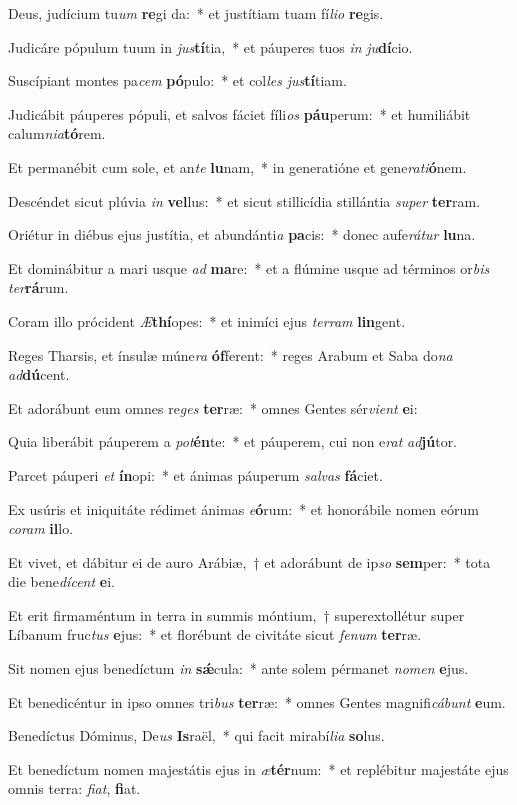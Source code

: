 \item Deus, judícium tu\textit{um} \textbf{re}gi da:~* et justítiam tuam fí\textit{li}\textit{o} \textbf{re}gis.
\item Judicáre pópulum tuum in \textit{jus}\textbf{tí}tia,~* et páuperes tuos \textit{in} \textit{ju}\textbf{dí}cio.
\item Suscípiant montes pa\textit{cem} \textbf{pó}pulo:~* et col\textit{les} \textit{jus}\textbf{tí}tiam.
\item Judicábit páuperes pópuli, et salvos fáciet fíli\textit{os} \textbf{páu}perum:~* et humiliábit calum\textit{ni}\textit{a}\textbf{tó}rem.
\item Et permanébit cum sole, et an\textit{te} \textbf{lu}nam,~* in generatióne et gene\textit{ra}\textit{ti}\textbf{ó}nem.
\item Descéndet sicut plúvia \textit{in} \textbf{vel}lus:~* et sicut stillicídia stillántia \textit{su}\textit{per} \textbf{ter}ram.
\item Oriétur in diébus ejus justítia, et abundánti\textit{a} \textbf{pa}cis:~* donec aufe\textit{rá}\textit{tur} \textbf{lu}na.
\item Et dominábitur a mari usque \textit{ad} \textbf{ma}re:~* et a flúmine usque ad términos or\textit{bis} \textit{ter}\textbf{rá}rum.
\item Coram illo prócident \textit{Æ}\textbf{thí}opes:~* et inimíci ejus \textit{ter}\textit{ram} \textbf{lin}gent.
\item Reges Tharsis, et ínsulæ múne\textit{ra} \textbf{óf}ferent:~* reges Arabum et Saba do\textit{na} \textit{ad}\textbf{dú}cent.
\item Et adorábunt eum omnes re\textit{ges} \textbf{ter}ræ:~* omnes Gentes sér\textit{vi}\textit{ent} \textbf{e}i:
\item Quia liberábit páuperem a \textit{pot}\textbf{én}te:~* et páuperem, cui non e\textit{rat} \textit{ad}\textbf{jú}tor.
\item Parcet páuperi \textit{et} \textbf{ín}opi:~* et ánimas páuperum \textit{sal}\textit{vas} \textbf{fá}ciet.
\item Ex usúris et iniquitáte rédimet ánimas \textit{e}\textbf{ó}rum:~* et honorábile nomen eórum \textit{co}\textit{ram} \textbf{il}lo.
\item Et vivet, et dábitur ei de auro Arábiæ,~† et adorábunt de ip\textit{so} \textbf{sem}per:~* tota die bene\textit{dí}\textit{cent} \textbf{e}i.
\item Et erit firmaméntum in terra in summis móntium,~† superextollétur super Líbanum fruc\textit{tus} \textbf{e}jus:~* et florébunt de civitáte sicut \textit{fe}\textit{num} \textbf{ter}ræ.
\item Sit nomen ejus benedíctum \textit{in} \textbf{sǽ}cula:~* ante solem pérmanet \textit{no}\textit{men} \textbf{e}jus.
\item Et benedicéntur in ipso omnes tri\textit{bus} \textbf{ter}ræ:~* omnes Gentes magnifi\textit{cá}\textit{bunt} \textbf{e}um.
\item Benedíctus Dóminus, De\textit{us} \textbf{Is}raël,~* qui facit mirabí\textit{li}\textit{a} \textbf{so}lus.
\item Et benedíctum nomen majestátis ejus in \textit{æ}\textbf{tér}num:~* et replébitur majestáte ejus omnis terra: \textit{fi}\textit{at}, \textbf{fi}at.
